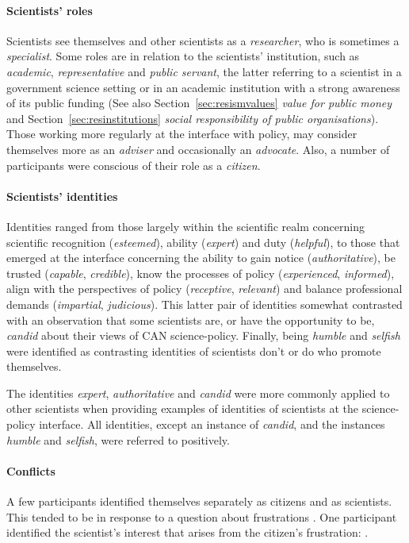 \paragraph{Scientists' roles}
Scientists see themselves and other scientists as a \emph{researcher}, who is sometimes a \emph{specialist}. Some roles are in relation to the scientists' institution, such as \emph{academic}, \emph{representative} and \emph{public servant}, the latter referring to a scientist in a government science setting or in an academic institution with a strong awareness of its public funding (See also Section~\ref{sec:resismvalues} \emph{value for public money} and Section~\ref{sec:resinstitutions} \emph{social responsibility of public organisations}). Those working more regularly at the interface with policy, may consider themselves more as an \emph{adviser} and occasionally an \emph{advocate}. Also, a number of participants were conscious of their role as a \emph{citizen}.

\paragraph{Scientists' identities}
Identities ranged from those largely within the scientific realm concerning scientific recognition (\emph{esteemed}), ability (\emph{expert}) and duty (\emph{helpful}), to those that emerged at the interface concerning the ability to gain notice (\emph{authoritative}), be trusted (\emph{capable}, \emph{credible}), know the processes of policy (\emph{experienced}, \emph{informed}), align with the perspectives of policy (\emph{receptive}, \emph{relevant}) and balance professional demands (\emph{impartial}, \emph{judicious}). This latter pair of identities somewhat contrasted with an observation that some scientists are, or have the opportunity to be, \emph{candid} about their views of CAN science-policy. Finally, being \emph{humble} and \emph{selfish} were identified as contrasting identities of scientists don't or do who promote themselves.

The identities \emph{expert}, \emph{authoritative} and \emph{candid} were more commonly applied to other scientists when providing examples of identities of scientists at the science-policy interface. All identities, except an instance of \emph{candid}, and the instances \emph{humble} and \emph{selfish}, were referred to positively.

\paragraph{Conflicts}
A few participants identified themselves separately as citizens and as scientists. This tended to be in response to a question about frustrations . One participant identified the scientist's interest that arises from the citizen's frustration: .

